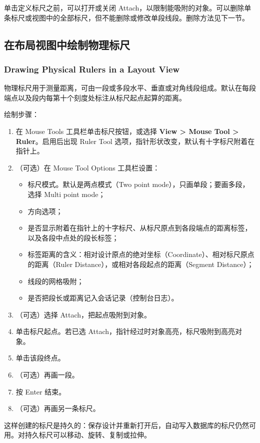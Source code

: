单击定义标尺之前，可以打开或关闭 Attach，以限制能吸附的对象。可以删除单条标尺或视图中的全部标尺，但不能删除或修改单段线段。删除方法见下一节。

\subsection{在布局视图中绘制物理标尺}
\subsubsection*{Drawing Physical Rulers in a Layout View}

物理标尺用于测量距离，可由一段或多段水平、垂直或对角线段组成。默认在每段端点以及段内每第十个刻度处标注从标尺起点起算的距离。

绘制步骤：
\begin{enumerate}
  \item 在 Mouse Tools 工具栏单击标尺按钮，或选择 \textbf{View > Mouse Tool > Ruler}。启用后出现 Ruler Tool 选项，指针形状改变，默认有十字标尺附着在指针上。
  \item （可选）在 Mouse Tool Options 工具栏设置：
  \begin{itemize}
    \item 标尺模式。默认是两点模式（Two point mode），只画单段；要画多段，选择 Multi point mode；
    \item 方向选项；
    \item 是否显示附着在指针上的十字标尺、从标尺原点到各段端点的距离标签，以及各段中点处的段长标签；
    \item 标签距离的含义：相对设计原点的绝对坐标（Coordinate）、相对标尺原点的距离（Ruler Distance），或相对各段起点的距离（Segment Distance）；
    \item 线段的网格吸附；
    \item 是否把段长或距离记入会话记录（控制台日志）。
  \end{itemize}
  \item （可选）选择 Attach，把起点吸附到对象。
  \item 单击标尺起点。若已选 Attach，指针经过时对象高亮，标尺吸附到高亮对象。
  \item 单击该段终点。
  \item （可选）再画一段。
  \item 按 Enter 结束。
  \item （可选）再画另一条标尺。
\end{enumerate}

这样创建的标尺是持久的：保存设计并重新打开后，自动写入数据库的标尺仍然可用。对持久标尺可以移动、旋转、复制或拉伸。

